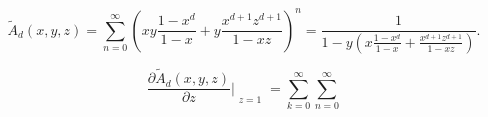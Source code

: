 \documentclass{article}
\begin{document}
\begin{equation*}
\tilde{A}_d(x,y,z) = \sum_{n=0}^\infty \left(xy\frac{1-x^d}{1-x} +
y\frac{x^{d+1}z^{d+1}}{1-xz}\right)^n =
\frac{1}{1-y \left(x\frac{1-x^d}{1-x} +
\frac{x^{d+1}z^{d+1}}{1-xz} \right)}.
\end{equation*}

\begin{equation*}
\frac{\partial\tilde{A}_d(x,y,z)}{\partial z}\Bigr|_{\substack{\\z=1}} =
\sum_{k=0}^\infty\sum_{n=0}^\infty
\end{equation*}






\end{document}
